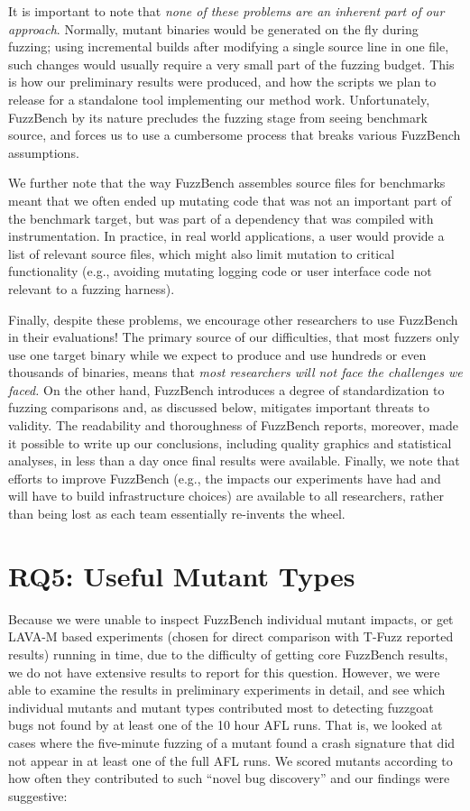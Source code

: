 It is important to note that \emph{none of these problems are an inherent part of our approach}.  Normally, mutant binaries would be generated on the fly during fuzzing; using incremental builds after modifying a single source line in one file, such changes would usually require a very small part of the fuzzing budget.  This is how our preliminary results were produced, and how the scripts we plan to release for a standalone tool implementing our method work.  Unfortunately, FuzzBench by its nature precludes the fuzzing stage from seeing benchmark source, and forces us to use a cumbersome process that breaks various FuzzBench assumptions.

We further note that the way FuzzBench assembles source files for benchmarks meant that we often ended up mutating code that was not an important part of the benchmark target, but was part of a dependency that was compiled with instrumentation.  In practice, in real world applications, a user would provide a list of relevant source files, which might also limit mutation to critical functionality (e.g., avoiding mutating logging code or user interface code not relevant to a fuzzing harness).

Finally, despite these problems, we encourage other researchers to use FuzzBench in their evaluations!  The primary source of our difficulties, that most fuzzers only use one target binary while we expect to produce and use hundreds or even thousands of binaries, means that \emph{most researchers will not face the challenges we faced.}  On the other hand, FuzzBench introduces a degree of standardization to fuzzing comparisons and, as discussed below, mitigates important threats to validity.  The readability and thoroughness of FuzzBench reports, moreover, made it possible to write up our conclusions, including quality graphics and statistical analyses, in less than a day once final results were available.  Finally, we note that efforts to improve FuzzBench (e.g., the impacts our experiments have had and will have to build infrastructure choices) are available to all researchers, rather than being lost as each team essentially re-invents the wheel.

\section{RQ5: Useful Mutant Types}

Because we were unable to inspect FuzzBench individual mutant impacts, or get LAVA-M based experiments (chosen for direct comparison with T-Fuzz reported results) running in time, due to the difficulty of getting core FuzzBench results, we do not have extensive results to report for this question.  However, we were able to examine the results in preliminary experiments in detail, and see which individual mutants and mutant types contributed most to detecting fuzzgoat bugs not found by at least one of the 10 hour AFL runs.  That is, we looked at cases where the five-minute fuzzing of a mutant found a crash signature that did not appear in at least one of the full AFL runs.  We scored mutants according to how often they contributed to such ``novel bug discovery'' and our findings were suggestive:

